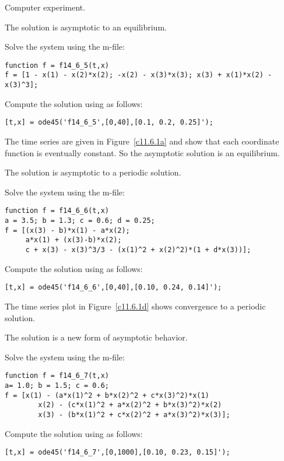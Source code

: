 \documentclass{ximera}
\begin{document}
\newpage
{} Computer experiment.

 \ans The solution is asymptotic to an equilibrium.

\soln Solve the system using the m-file:
\begin{verbatim}
function f = f14_6_5(t,x)
f = [1 - x(1) - x(2)*x(2); -x(2) - x(3)*x(3); x(3) + x(1)*x(2) - x(3)^3];
\end{verbatim}

Compute the solution using \Matlab as follows:
\begin{verbatim}
[t,x] = ode45('f14_6_5',[0,40],[0.1, 0.2, 0.25]');
\end{verbatim}

The time series are given in Figure~\ref{c11.6.1a} and show
that each coordinate function is eventually constant.  So the asymptotic
solution is an equilibrium.

\begin{figure}[htb]
     \centerline{%
     }
\end{figure}

 \ans The solution is asymptotic to a periodic solution.

\soln Solve the system using the m-file:
\begin{verbatim}
function f = f14_6_6(t,x)
a = 3.5; b = 1.3; c = 0.6; d = 0.25;
f = [(x(3) - b)*x(1) - a*x(2); 
     a*x(1) + (x(3)-b)*x(2); 
     c + x(3) - x(3)^3/3 - (x(1)^2 + x(2)^2)*(1 + d*x(3))];
\end{verbatim}

Compute the solution using \Matlab as follows:
\begin{verbatim}
[t,x] = ode45('f14_6_6',[0,40],[0.10, 0.24, 0.14]');
\end{verbatim}
The time series plot in Figure~\ref{c11.6.1d} shows convergence to a periodic 
solution.  

\begin{figure}[htb]
     \centerline{%
     }
\end{figure}

 \ans The solution is a new form of asymptotic behavior.

\soln Solve the system  using the m-file:
\begin{verbatim}
function f = f14_6_7(t,x)
a= 1.0; b = 1.5; c = 0.6;
f = [x(1) - (a*x(1)^2 + b*x(2)^2 + c*x(3)^2)*x(1) 
        x(2) - (c*x(1)^2 + a*x(2)^2 + b*x(3)^2)*x(2)
        x(3) - (b*x(1)^2 + c*x(2)^2 + a*x(3)^2)*x(3)];
\end{verbatim}
Compute the solution using \Matlab as follows:
\begin{verbatim}
[t,x] = ode45('f14_6_7',[0,1000],[0.10, 0.23, 0.15]');
\end{verbatim}
\end{document}
